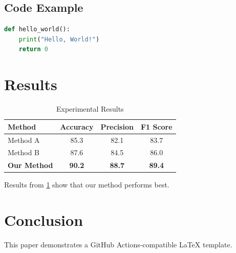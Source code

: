 \documentclass[12pt, a4paper]{article}
\begin{document}
\subsection{Code Example}

\begin{lstlisting}[language=Python, caption=Python Code Example]
def hello_world():
    print("Hello, World!")
    return 0
\end{lstlisting}

\section{Results}

\begin{table}[H]
    \centering
    \caption{Experimental Results}
    \label{tab:results}
    \begin{tabular}{lccc}
        \toprule
        Method & Accuracy & Precision & F1 Score \\
        \midrule
        Method A & 85.3 & 82.1 & 83.7 \\
        Method B & 87.6 & 84.5 & 86.0 \\
        \textbf{Our Method} & \textbf{90.2} & \textbf{88.7} & \textbf{89.4} \\
        \bottomrule
    \end{tabular}
\end{table}

Results from \cref{tab:results} show that our method performs best.

\section{Conclusion}

This paper demonstrates a GitHub Actions-compatible LaTeX template.

\newpage
\printbibliography
\end{document}
